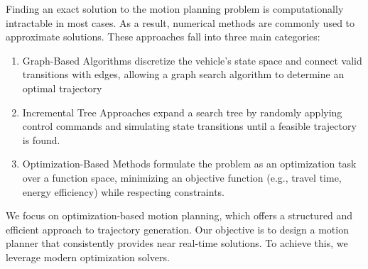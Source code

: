 Finding an exact solution to the motion planning problem is computationally intractable in most cases.
As a result, numerical methods are commonly used to approximate solutions.
These approaches fall into three main categories:

\begin{enumerate}
	\item Graph-Based Algorithms discretize the vehicle's state space and connect valid
	      transitions with edges, allowing a graph search algorithm to determine an optimal
	      trajectory

	\item Incremental Tree Approaches expand a search tree by randomly applying control
	      commands and simulating state transitions until a feasible trajectory is found.

	\item Optimization-Based Methods formulate the problem as an optimization task over a function space, minimizing an objective function (e.g., travel time, energy efficiency)
	      while respecting constraints.
\end{enumerate}

We focus on optimization-based motion planning, which offers a structured and efficient approach to trajectory generation.
Our objective is to design a motion planner that consistently provides near real-time solutions.
To achieve this, we leverage modern optimization solvers.
